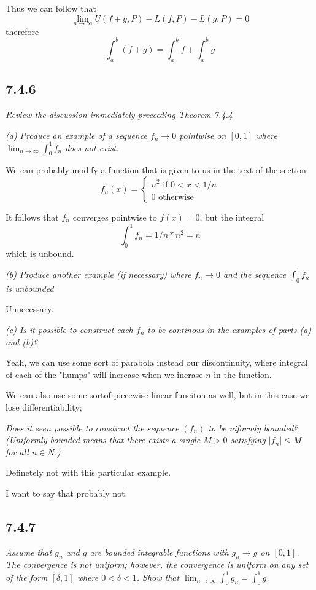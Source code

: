 \documentclass[11pt,oneside,titlepage]{book}
\begin{document}
Thus we can follow that
$$\lim_{n \to \infty}{U(f + g, P) - L(f, P) - L(g, P)} = 0$$
therefore
$$\int_a^b (f + g) = \int_a^b f + \int_a^b g$$

\subsection*{7.4.6}
\textit{Review the discussion immediately preceeding Theorem 7.4.4}

\textit{(a) Produce an example of a sequence $f_n \to 0$ pointwise on $[0, 1]$
  where $\lim_{n \to \infty}{\int_0^1 f_n}$ does not exist.}

We can probably modify a function that is given to us in the text of the
section
$$f_n(x) =
\begin{cases}
  n^2 \text{ if } 0 < x < 1/n \\
  0 \text{ otherwise }
\end{cases}
$$

It follows that $f_n$ converges pointwise to $f(x) = 0$, but the integral
$$\int_0^1{f_n} = 1/n * n^2 = n$$
which is unbound.

\textit{(b) Produce another example (if necessary) where $f_n \to 0$ and the
  sequence $\int_0^1 f_n$ is unbounded}

Unnecessary.

\textit{(c) Is it possible to construct each $f_n$ to be continous in the
  examples of parts (a) and (b)?}

Yeah, we can use some sort of parabola instead our discontinuity, where
integral of each of the  "humps" will increase when we incrase $n$ in
the function.

We can also use some sortof piecewise-linear funciton as well, but in this
case we lose differentiability;

\textit{Does it seen possible to construct the sequence $(f_n)$ to be
  niformly bounded? (Uniformly bounded means that there exists a
  single $M > 0$ satisfying $|f_n| \leq M$ for all $n \in N$.)}

Definetely not with this particular example.

I want to say that probably not.

\subsection*{7.4.7}
\textit{Assume that $g_n$ and $g$ are bounded integrable functions with
  $g_n \to g$ on $[0, 1]$. The convergence is not uniform; however, the
  convergence is uniform on any set of the form $[\delta, 1]$ where
  $0 < \delta < 1$. Show that
  $\lim_{n \to \infty}{\int_0^1 g_n} = \int_0^1 g$.}
\end{document}
